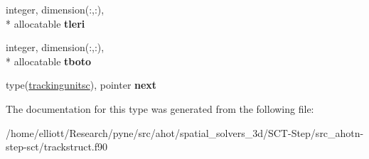 \begin{DoxyCompactItemize}
\item 
\hypertarget{structtracking__data__structures_1_1trackingunitsc_af498c2cfd96a18df741805988a6d3ea5}{integer, dimension(\-:,\-:), \\*
allocatable {\bfseries tleri}}\label{structtracking__data__structures_1_1trackingunitsc_af498c2cfd96a18df741805988a6d3ea5}

\item 
\hypertarget{structtracking__data__structures_1_1trackingunitsc_a6b3cceaa9cf6b60ea0330fc48f3ab107}{integer, dimension(\-:,\-:), \\*
allocatable {\bfseries tboto}}\label{structtracking__data__structures_1_1trackingunitsc_a6b3cceaa9cf6b60ea0330fc48f3ab107}

\item 
\hypertarget{structtracking__data__structures_1_1trackingunitsc_ad91a2408f427440a9f4a543bc5923a92}{type(\hyperlink{structtracking__data__structures_1_1trackingunitsc}{trackingunitsc}), pointer {\bfseries next}}\label{structtracking__data__structures_1_1trackingunitsc_ad91a2408f427440a9f4a543bc5923a92}

\end{DoxyCompactItemize}


The documentation for this type was generated from the following file\-:\begin{DoxyCompactItemize}
\item 
/home/elliott/\-Research/pyne/src/ahot/spatial\-\_\-solvers\-\_\-3d/\-S\-C\-T-\/\-Step/src\-\_\-ahotn-\/step-\/sct/trackstruct.\-f90\end{DoxyCompactItemize}
